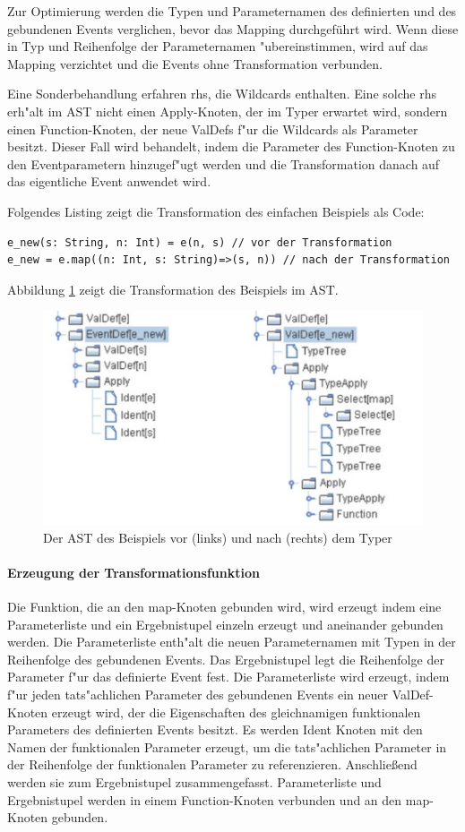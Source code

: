 \documentclass[a4paper,11pt,parskip=half]{scrartcl}
\begin{document}
Zur Optimierung werden die Typen und Parameternamen des definierten und des gebundenen Events verglichen, bevor das Mapping durchgeführt wird.
Wenn diese in Typ und Reihenfolge der Parameternamen "ubereinstimmen, wird auf das Mapping verzichtet und die Events ohne Transformation verbunden.

Eine Sonderbehandlung erfahren rhs, die Wildcards enthalten.
Eine solche rhs erh"alt im AST nicht einen Apply-Knoten, der im Typer erwartet wird, sondern einen Function-Knoten, der neue ValDefs f"ur die Wildcards als Parameter besitzt.
Dieser Fall wird behandelt, indem die Parameter des Function-Knoten zu den Eventparametern hinzugef"ugt werden und die Transformation danach auf das eigentliche Event anwendet wird.

Folgendes Listing zeigt die Transformation des einfachen Beispiels als Code:
\begin{lstlisting}
e_new(s: String, n: Int) = e(n, s) // vor der Transformation
e_new = e.map((n: Int, s: String)=>(s, n)) // nach der Transformation
\end{lstlisting}

Abbildung \ref{fig:ast} zeigt die Transformation des Beispiels im AST.
\begin{figure}[h]
  \centering
  \includegraphics[width=.6\linewidth]{ast}
  \caption{Der AST des Beispiels vor (links) und nach (rechts) dem Typer}
  \label{fig:ast}
\end{figure}

\paragraph{Erzeugung der Transformationsfunktion}
Die Funktion, die an den map-Knoten gebunden wird, wird erzeugt indem eine Parameterliste und ein Ergebnistupel einzeln erzeugt und aneinander gebunden werden.
Die Parameterliste enth"alt die neuen Parameternamen mit Typen in der Reihenfolge des gebundenen Events.
Das Ergebnistupel legt die Reihenfolge der Parameter f"ur das definierte Event fest.
Die Parameterliste wird erzeugt, indem f"ur jeden tats"achlichen Parameter des gebundenen Events ein neuer ValDef-Knoten erzeugt wird, der die Eigenschaften des gleichnamigen funktionalen Parameters des definierten Events besitzt.
Es werden Ident Knoten mit den Namen der funktionalen Parameter erzeugt, um die tats"achlichen Parameter in der Reihenfolge der funktionalen Parameter zu referenzieren. 
Anschlie{\ss}end werden sie zum Ergebnistupel zusammengefasst.
Parameterliste und Ergebnistupel werden in einem Function-Knoten verbunden und an den map-Knoten gebunden.
\end{document}
